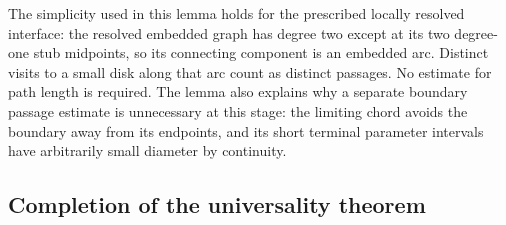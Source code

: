 The simplicity used in this lemma holds for the prescribed locally
resolved interface: the resolved embedded graph has degree two except
at its two degree-one stub midpoints, so its connecting component is an
embedded arc.  Distinct visits to a small disk along that arc count as
distinct passages.  No estimate for path length is required.  The lemma
also explains why a separate boundary passage estimate is unnecessary
at this stage: the limiting chord avoids the boundary away from its
endpoints, and its short terminal parameter intervals have arbitrarily
small diameter by continuity.

\subsection{Completion of the universality theorem}

